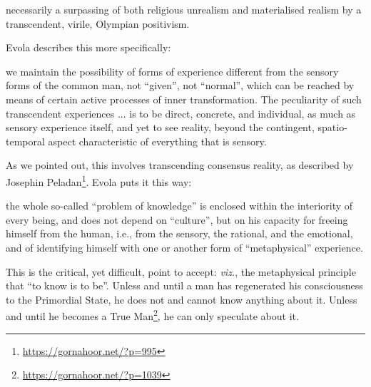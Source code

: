 \begin{quotex}
necessarily a surpassing of both religious unrealism and materialised realism by a transcendent, virile, Olympian positivism.
\end{quotex}


Evola describes this more specifically:

\begin{quotex}
we maintain the possibility of forms of experience different from the sensory forms of the common man, not ``given'', not ``normal'', which can be reached by means of certain active processes of inner transformation. The peculiarity of such transcendent experiences ... is to be direct, concrete, and individual, as much as sensory experience itself, and yet to see reality, beyond the contingent, spatio-temporal aspect characteristic of everything that is sensory.

\end{quotex}


As we pointed out, this involves transcending consensus reality, as described by Josephin Peladan\footnote{\url{https://gornahoor.net/?p=995}}. Evola puts it this way:

\begin{quotex}
the whole so-called ``problem of knowledge'' is enclosed within the interiority of every being, and does not depend on ``culture'', but on his capacity for freeing himself from the human, i.e., from the sensory, the rational, and the emotional, and of identifying himself with one or another form of ``metaphysical'' experience.
\end{quotex}


This is the critical, yet difficult, point to accept: \emph{viz.}, the metaphysical principle that ``to know is to be''. Unless and until a man has regenerated his consciousness to the Primordial State, he does not and cannot know anything about it. Unless and until he becomes a True Man\footnote{\url{https://gornahoor.net/?p=1039}}, he can only speculate about it.

